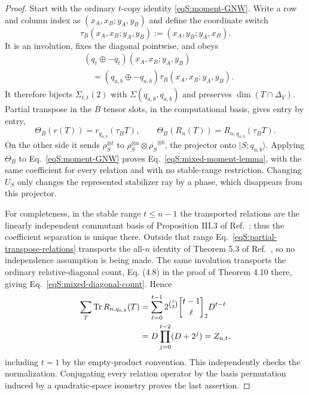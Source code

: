 \documentclass[journal,twocolumn]{IEEEtran}
\theoremstyle{definition}
\theoremstyle{plain}
\newcommand{\Tr}{\operatorname{Tr}}
\newcommand{\gbinom}[3]{\genfrac{[}{]}{0pt}{}{#1}{#2}_{#3}}
\begin{document}
\begin{proof}
Start with the ordinary $t$-copy identity
\eqref{eqS:moment-GNW}.  Write a row and column index as
$(x_A,x_B;y_A,y_B)$ and define the coordinate switch
\begin{equation}
 \tau_B(x_A,x_B;y_A,y_B):=(x_A,y_B;y_A,x_B).
 \label{eqS:coordinate-switch}
\end{equation}
It is an involution, fixes the diagonal pointwise, and obeys
\begin{equation}
 \begin{aligned}
 &(q_t\oplus-q_t)(x_A,x_B;y_A,y_B)\\
 &\quad=(q_{a,b}\oplus-q_{a,b})\tau_B(x_A,x_B;y_A,y_B).
 \end{aligned}
\end{equation}
It therefore bijects $\Sigma_{t,t}(2)$ with
$\Sigma(q_{a,b},q_{a,b})$ and preserves
$\dim(T\cap\Delta_V)$.  Partial transpose in the $B$ tensor slots, in the
computational basis, gives entry by entry,
\begin{equation}
 \Theta_B(r(T))=r_{q_{a,b}}(\tau_BT),
 \qquad
 \Theta_B(R_n(T))=R_{n,q_{a,b}}(\tau_BT).
 \label{eqS:partial-transpose-relations}
\end{equation}
On the other side it sends
$\rho_S^{\otimes t}$ to
$\rho_S^{\otimes a}\otimes\overline{\rho_S}^{\otimes b}$, the projector
onto $|S;q_{a,b}\rangle$.  Applying $\Theta_B$ to
Eq.~\eqref{eqS:moment-GNW} proves
Eq.~\eqref{eqS:mixed-moment-lemma}, with the same coefficient for every
relation and with no stable-range restriction.  Changing $U_S$ only
changes the represented stabilizer ray by a phase, which disappears from
this projector.

For completeness, in the stable range $t\leq n-1$ the transported
relations are the linearly independent commutant basis of Proposition
III.3 of Ref.~\cite{MontealegreGross2025}; thus the coefficient separation
is unique there.  Outside that range Eq.~\eqref{eqS:partial-transpose-relations}
transports the all-$n$ identity of Theorem 5.3 of
Ref.~\cite{GrossNezamiWalter2021}, so no independence assumption is being
made.  The same involution transports the ordinary relative-diagonal
count, Eq. (4.8) in the proof of Theorem 4.10 there, giving
Eq.~\eqref{eqS:mixed-diagonal-count}.  Hence
\begin{align}
 \sum_T\Tr R_{n,q_{a,b}}(T)
 &=\sum_{\ell=0}^{t-1}2^{\binom\ell2}
   \gbinom{t-1}{\ell}{2}D^{t-\ell}\notag\\
 &=D\prod_{j=0}^{t-2}(D+2^j)=Z_{n,t},
\end{align}
including $t=1$ by the empty-product convention.  This independently
checks the normalization.  Conjugating every relation operator by the
basis permutation induced by a quadratic-space isometry proves the last
assertion.
\end{proof}
\end{document}
